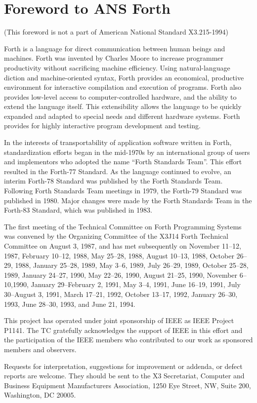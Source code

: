 \vspace*{-6ex}\chapter*{Foreword to ANS Forth}

(This foreword is not a part of American National Standard X3.215-1994)

Forth is a language for direct communication between human beings and
machines. Forth was invented by Charles Moore to increase programmer
productivity without sacrificing machine efficiency.
Using natural-language diction and machine-oriented syntax,
Forth provides an economical, productive environment for interactive
compilation and execution of programs. Forth also provides low-level
access to computer-controlled hardware, and the ability to extend the
language itself. This extensibility allows the language to be quickly
expanded and adapted to special needs and different hardware systems.
Forth provides for highly interactive program development and testing.

In the interests of transportability of application software written in
Forth, standardization efforts began in the mid-1970s by an international
group of users and implementors who adopted the name ``Forth Standards Team''.
This effort resulted in the Forth-77 Standard. As the language continued
to evolve, an interim Forth-78 Standard was published by the Forth Standards
Team. Following Forth Standards Team meetings in 1979, the Forth-79 Standard
was published in 1980. Major changes were made by the Forth Standards Team
in the Forth-83 Standard, which was published in 1983.

The first meeting of the Technical Committee on Forth Programming Systems
was convened by the Organizing Committee of the X3J14 Forth Technical
Committee on August 3, 1987, and has met subsequently on
November 11--12, 1987,
February 10--12, 1988,
May 25--28, 1988,
August 10--13, 1988,
October 26--29, 1988,
January 25--28, 1989,
May 3--6, 1989,
July 26--29, 1989,
October 25--28, 1989,
January 24--27, 1990,
May 22--26, 1990,
August 21--25, 1990,
November 6--10,1990,
January 29--February 2, 1991,
May 3--4, 1991,
June 16--19, 1991,
July 30--August 3, 1991,
March 17--21, 1992,
October 13--17, 1992,
January 26--30, 1993,
June 28--30, 1993,
and
June 21, 1994.

This project has operated under joint sponsorship of IEEE as IEEE Project P1141.
The TC gratefully acknowledges the support of IEEE in this effort and the
participation of the IEEE members who contributed to our work as sponsored
members and observers.

Requests for interpretation, suggestions for improvement or addenda, or defect
reports are welcome. They should be sent to the X3 Secretariat, Computer and
Business Equipment Manufacturers Association, 1250 Eye Street, NW, Suite 200,
Washington, DC 20005.
